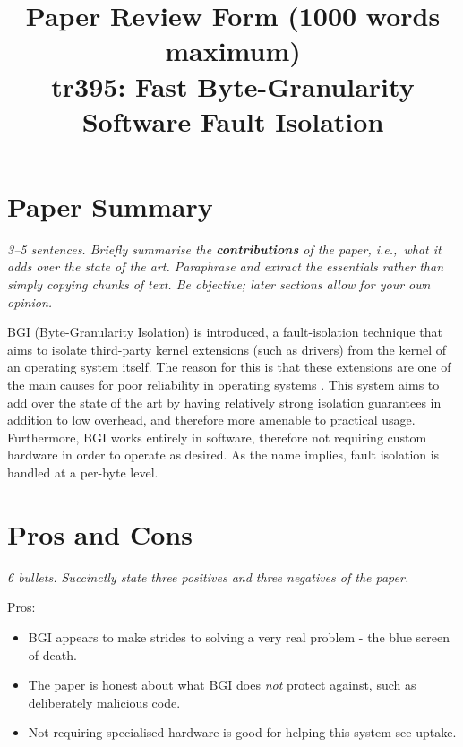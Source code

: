 \documentclass[11pt]{article}
\begin{document}

\title{Paper Review Form (1000 words maximum)\\
    tr395: Fast Byte-Granularity Software Fault Isolation \cite{BGI}}

\maketitle

\section*{Paper Summary}

\textsl{3--5 sentences. Briefly summarise the {\bf contributions} of the paper,
i.e.,~what it adds over the state of the art. Paraphrase and extract the
essentials rather than simply copying chunks of text. Be objective; later
sections allow for your own opinion.}

BGI (Byte-Granularity Isolation) is introduced, a fault-isolation technique
that aims to isolate third-party kernel extensions (such as drivers) from the
kernel of an operating system itself. The reason for this is that these
extensions are one of the main causes for poor reliability in operating systems
\cite{OSErrors}. This system aims to add over the state of the art by having
relatively strong isolation guarantees in addition to low overhead, and
therefore more amenable to practical usage. Furthermore, BGI works entirely in
software, therefore not requiring custom hardware in order to operate as
desired. As the name implies, fault isolation is handled at a per-byte level.


\section*{Pros and Cons}

\textsl{6 bullets. Succinctly state three positives and three negatives of the
paper.}

Pros:

\begin{itemize}

    \item BGI appears to make strides to solving a very real problem - the blue
    screen of death.

    \item The paper is honest about what BGI does \textit{not} protect against,
    such as deliberately malicious code.

    \item Not requiring specialised hardware is good for helping this system
    see uptake.

\end{itemize}
\end{document}
